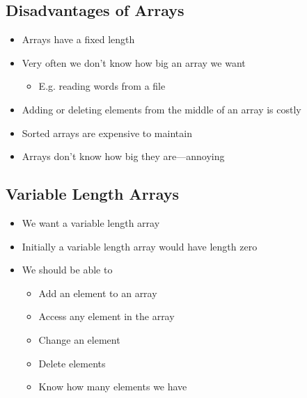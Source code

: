 
\begin{slide}
\section{Disadvantages of Arrays}

\begin{PauseHighLight}
  \begin{itemize}
  \item Arrays have a fixed length\pause
  \item Very often we don't know how big an array we want
    \begin{itemize}
    \item E.g. reading words from a file\pause
    \end{itemize}
  \item Adding or deleting elements from the middle of an array is
    costly\pause
  \item Sorted arrays are expensive to maintain\pause
  \item Arrays don't know how big they are\pause---annoying\pauseb
  \end{itemize}
\end{PauseHighLight}

\end{slide}

\Outline


\begin{slide}
\section{Variable Length Arrays}
\begin{PauseHighLight}
  \begin{itemize}
  \item We want a variable length array\pause
  \item Initially a variable length array would have length zero\pause
  \item We should be able to
    \begin{itemize}
    \item Add an element to an array
    \item Access any element in the array
    \item Change an element
    \item Delete elements
    \item Know how many elements we have\pause
    \end{itemize}
  \end{itemize}
\end{PauseHighLight}
\end{slide}

